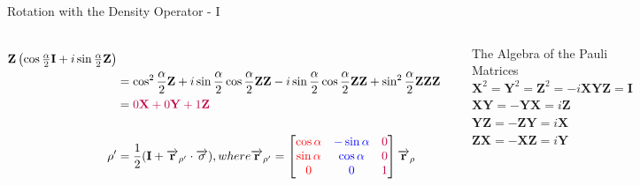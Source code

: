 \documentclass{beamer}
\begin{document}
\begin{frame}{Rotation with the Density Operator - I\tiny{\cite{rotationsonblochsphere}}}
{\begin{columns}
\begin{align*}
                  \mathbf{Z}
                  \begin{pmatrix} \cos\frac{\alpha}2\mathbf{I} + i\sin\frac{\alpha}2 \mathbf{Z} \end{pmatrix} \\
            &=    \cos^2\frac{\alpha}2 \mathbf{Z}
                + i\sin\frac{\alpha}2 \cos\frac{\alpha}2 \mathbf{Z}\mathbf{Z}
                - i\sin\frac{\alpha}2 \cos\frac{\alpha}2 \mathbf{Z}\mathbf{Z}
                + \sin^2\frac{\alpha}2 \mathbf{Z}\mathbf{Z}\mathbf{Z} \\
            &=    {\color{purple}0 \mathbf{X}  + 0 \mathbf{Y} + 1\mathbf{Z}} \\
      \\
      \rho' &= \frac{1}2 ( \mathbf{I} + \overrightarrow{\mathbf{r}}_{\rho'} \cdot\overrightarrow{\sigma} )
            , where \overrightarrow{\mathbf{r}}_{\rho'} =
              \begin{bmatrix}
                {\color{red}\cos\alpha} & {\color{blue}-\sin\alpha} & {\color{purple}0} \\
                {\color{red}\sin\alpha} & {\color{blue}\cos\alpha}  & {\color{purple}0} \\
                {\color{red}0}          & {\color{blue}0}           & {\color{purple}1}
              \end{bmatrix}
              \overrightarrow{\mathbf{r}}_{\rho}
    \end{align*}
    \begin{block}{The Algebra of the Pauli Matrices}
      $\mathbf{X}^2 = \mathbf{Y}^2 = \mathbf{Z}^2 = -i\mathbf{XYZ} = \mathbf{I}$ \\
      $\mathbf{XY} = -\mathbf{YX} = i\mathbf{Z}$ \\
      $\mathbf{YZ} = -\mathbf{ZY} = i\mathbf{X}$ \\
      $\mathbf{ZX} = -\mathbf{XZ} = i\mathbf{Y}$
    \end{block}
    \end{columns}
  }%
\end{frame}
\end{document}
